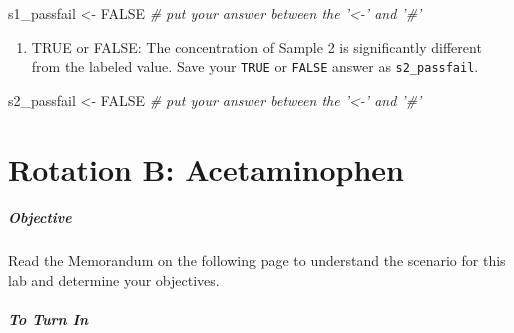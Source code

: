 \documentclass[]{tufte-book}
\newenvironment{Shaded}{}{}
\newcommand{\CommentTok}[1]{\textcolor[rgb]{0.38,0.63,0.69}{\textit{#1}}}
\newcommand{\NormalTok}[1]{#1}
\newcommand{\OtherTok}[1]{\textcolor[rgb]{0.00,0.44,0.13}{#1}}
\newcommand{\StringTok}[1]{\textcolor[rgb]{0.25,0.44,0.63}{#1}}
\providecommand{\tightlist}{%
  \setlength{\itemsep}{0pt}\setlength{\parskip}{0pt}}
\begin{document}
\begin{Shaded}
\begin{Highlighting}[]
\NormalTok{s1_passfail <-}\StringTok{ }\OtherTok{FALSE}     \CommentTok{# put your answer between the '<-' and '#'}
\end{Highlighting}
\end{Shaded}

\begin{enumerate}
\def\labelenumi{\arabic{enumi}.}
\setcounter{enumi}{10}
\tightlist
\item
  TRUE or FALSE: The concentration of Sample 2 is significantly different from the labeled value. Save your \texttt{TRUE} or \texttt{FALSE} answer as \texttt{s2\_passfail}.
\end{enumerate}

\begin{Shaded}
\begin{Highlighting}[]
\NormalTok{s2_passfail <-}\StringTok{ }\OtherTok{FALSE}     \CommentTok{# put your answer between the '<-' and '#'}
\end{Highlighting}
\end{Shaded}

\hypertarget{rotation-b-acetaminophen}{%
\chapter{Rotation B: Acetaminophen}\label{rotation-b-acetaminophen}}

\hypertarget{objective-1}{%
\paragraph{\texorpdfstring{\textbf{Objective}}{Objective}}\label{objective-1}}

Read the Memorandum on the following page to understand the scenario for this lab and determine your objectives.

\hypertarget{to-turn-in-2}{%
\paragraph{\texorpdfstring{\textbf{To Turn In}}{To Turn In}}\label{to-turn-in-2}}
\end{document}
